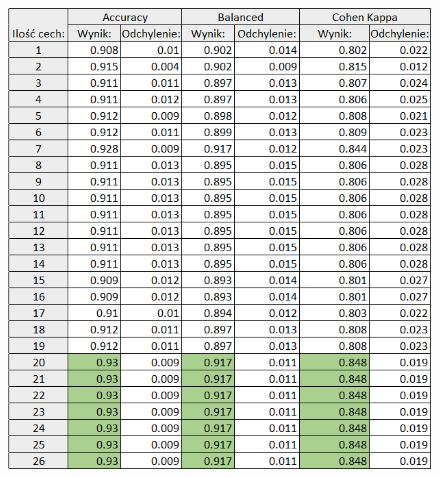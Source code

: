\documentclass[12pt]{article}
\begin{document}
\begin{figure}[H]
	\centering
	\label{metryki_euklides_bnorm_tab}
		\includegraphics[scale=0.9]{images/metrics/9nn_euklides_beznorm_tab.png}
	
\end{figure}
\end{document}
